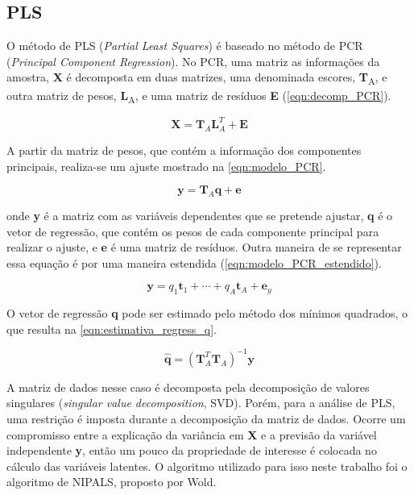 		\subsection{PLS}
		
		O método de PLS (\emph{Partial Least Squares}) é baseado no método de PCR (\emph{Principal Component Regression}). No PCR, uma matriz as informações da amostra, \textbf{X} é decomposta em duas matrizes, uma denominada escores, \textbf{T}\textsubscript{A}, e outra matriz de pesos, \textbf{L}\textsubscript{A}, e uma matriz de resíduos \textbf{E} (\autoref{eqn:decomp_PCR}).
		
		\begin{equation}
			\mathbf{X} = \mathbf{T}_A \mathbf{L}_A^T + \mathbf{E}
			\label{eqn:decomp_PCR}
		\end{equation}
		
		A partir da matriz de pesos, que contém a informação dos componentes principais, realiza-se um ajuste mostrado na \autoref{eqn:modelo_PCR}.
		
		\begin{equation}
			\mathbf{y} = \mathbf{T}_A\mathbf{q} + \mathbf{e}
			\label{eqn:modelo_PCR}
		\end{equation}
		
		\noindent onde \textbf{y} é a matriz com as variáveis dependentes que se pretende ajustar, \textbf{q} é o vetor de regressão, que contém os pesos de cada componente principal para realizar o ajuste, e \textbf{e} é uma matriz de resíduos. Outra maneira de se representar essa equação é por uma maneira estendida (\autoref{eqn:modelo_PCR_estendido}).
		
		\begin{equation}
			\mathbf{y} = q_1\mathbf{t}_1 + \cdots + q_A\mathbf{t}_A + \mathbf{e}_y
			\label{eqn:modelo_PCR_estendido}
		\end{equation}
		
		O vetor de regressão \textbf{q} pode ser estimado pelo método dos mínimos quadrados, o que resulta na \autoref{eqn:estimativa_regress_q}.
		
		\begin{equation}
			\hat{\textbf{q}} = \left(  \mathbf{T}_A^T \mathbf{T}_A  \right)^{-1}\mathbf{y}
			\label{eqn:estimativa_regress_q}
		\end{equation}

		A matriz de dados nesse caso é decomposta pela decomposição de valores singulares (\emph{singular value decomposition}, SVD). Porém, para a análise de PLS, uma restrição é imposta durante a decomposição da matriz de dados. Ocorre um compromisso entre a explicação da variância em \textbf{X} e a previsão da variável independente \textbf{y}, então um pouco da propriedade de interesse é colocada no cálculo das variáveis latentes. O algoritmo utilizado para isso neste trabalho foi o algoritmo de NIPALS, proposto por Wold.
		
